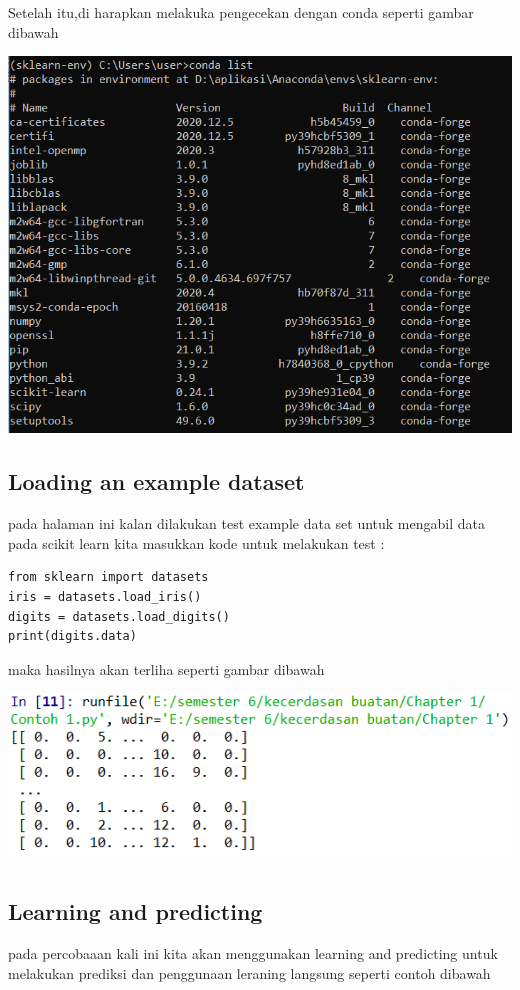\documentclass{homework}
\begin{document}
Setelah itu,di harapkan melakuka pengecekan dengan conda seperti gambar dibawah
\begin{center}
    \includegraphics[width=.8\textwidth]{Figure/instal3.PNG}
\end{center}

\subsection{Loading an example dataset}
pada halaman ini kalan dilakukan test example data set untuk mengabil data pada scikit learn 
kita masukkan kode untuk melakukan test :

\begin{verbatim}
from sklearn import datasets
iris = datasets.load_iris()
digits = datasets.load_digits()
print(digits.data)
\end{verbatim}
maka hasilnya akan terliha seperti gambar dibawah 

\begin{center}
    \includegraphics[width=.8\textwidth]{Figure/hasil1.PNG}
\end{center}

\subsection{Learning and predicting}
pada percobaaan kali ini kita akan menggunakan learning and predicting untuk melakukan prediksi dan penggunaan leraning langsung seperti contoh dibawah
\end{document}
